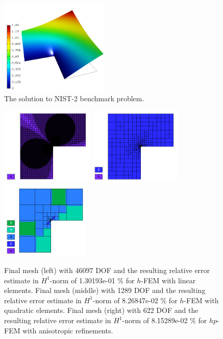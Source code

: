 \documentclass[12pt]{elsarticle}
\begin{document}
\begin{figure}[H]
\centering
\vspace{-3mm}
\includegraphics[height=4.5cm]{nist/nist-2/solution.png}
\caption{The solution to NIST-2 benchmark problem.}
\vspace{-3mm}
\label{fig:sln-nist02}
\end{figure}

\begin{figure}[H]
\centering
\vspace{-3mm}
\includegraphics[height=3.7cm]{nist/nist-2/mesh_h1_aniso.png}
\includegraphics[height=3.7cm]{nist/nist-2/mesh_h2_aniso.png}
\includegraphics[height=3.7cm]{nist/nist-2/mesh_hp_aniso.png}
\vspace{-3mm}
\caption{
Final mesh (left) with 46097 DOF and the resulting
relative error estimate in $H^1$-norm of 1.30193e-01 \% for $h$-FEM with linear elements.
Final mesh (middle) with 1289 DOF and the resulting
relative error estimate in $H^1$-norm of 8.26847e-02 \% for $h$-FEM with quadratic elements.
Final mesh (right) with 622 DOF and the resulting
relative error estimate in $H^1$-norm of 8.15289e-02 \% for $hp$-FEM with anisotropic refinements.}
\vspace{-5mm}
\label{fig:nist-2-hp-aniso}
\end{figure}
\end{document}
